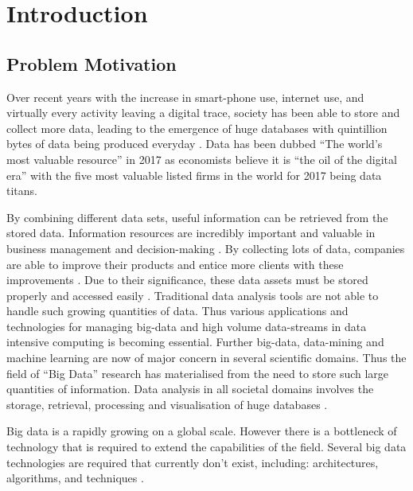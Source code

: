 %
%
%
%
\chapter{Introduction}\label{chap:introduction}
\vspace{-1cm}

\section{Problem Motivation}
Over recent years with the increase in smart-phone use, internet use, and virtually every activity leaving a digital trace, society has been able to store and collect more data, leading to the emergence of huge databases with quintillion bytes of data being produced everyday \cite{economist:2017:twm}. Data has been dubbed ``The world's most valuable resource'' in 2017 as economists believe it is ``the oil of the digital era'' with the five most valuable listed firms in the world for 2017 being data titans\cite{economist:2017:twm}. 

By combining different data sets, useful information can be retrieved from the stored data. Information resources are incredibly important and valuable in business management and decision-making \cite{golfarelli:2009:dwd,wang:2014sar}. By collecting lots of data, companies are able to improve their products and entice more clients with these improvements \cite{economist:2017:twm}. Due to their significance, these data assets must be stored properly and accessed easily \cite{golfarelli:2009:dwd}. Traditional data analysis tools are not able to handle such growing quantities of data. Thus various applications and technologies for managing big-data and high volume data-streams in data intensive computing is becoming essential. Further big-data, data-mining and machine learning are now of major concern in several scientific domains. Thus the field of “Big Data” research has materialised from the need to store such large quantities of information. Data analysis in all societal domains involves the storage, retrieval, processing and visualisation of huge databases \cite{otoo:2006:esa}. 

Big data is a rapidly growing on a global scale. However there is a bottleneck of technology that is required to extend the capabilities of the field. Several big data technologies are required that currently don't exist, including: architectures, algorithms, and techniques \cite{twala:2017:bda,moukhi:2015:dws}.

